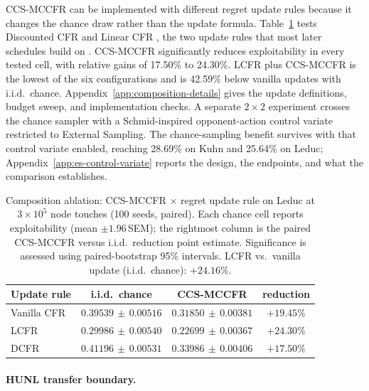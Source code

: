 \documentclass[11pt]{article}
\begin{document}
CCS-MCCFR can be implemented with different regret update rules because it changes the chance draw rather than the update formula. Table~\ref{tab:orthogonal} tests Discounted CFR and Linear CFR \citep{brown2019solving}, the two update rules that most later schedules build on \citep{xu2024dynamic,zhang2026faster}. CCS-MCCFR significantly reduces exploitability in every tested cell, with relative gains of 17.50\% to 24.30\%. LCFR plus CCS-MCCFR is the lowest of the six configurations and is 42.59\% below vanilla updates with i.i.d.\ chance. Appendix~\ref{app:composition-details} gives the update definitions, budget sweep, and implementation checks. A separate $2\times2$ experiment crosses the chance sampler with a Schmid-inspired opponent-action control variate restricted to External Sampling. The chance-sampling benefit survives with that control variate enabled, reaching 28.69\% on Kuhn and 25.64\% on Leduc; Appendix~\ref{app:es-control-variate} reports the design, the endpoints, and what the comparison establishes.

\begin{table}[h]
\centering
\small
\caption{Composition ablation: CCS-MCCFR $\times$ regret update rule on Leduc at $3\times10^5$ node touches (100 seeds, paired). Each chance cell reports exploitability (mean $\pm 1.96$\,SEM); the rightmost column is the paired CCS-MCCFR versus i.i.d.\ reduction point estimate. Significance is assessed using paired-bootstrap 95\% intervals. LCFR vs.\ vanilla update (i.i.d.\ chance): $+24.16\%$.}
\label{tab:orthogonal}
\begin{tabular}{lccc}
\toprule
Update rule & i.i.d.\ chance & CCS-MCCFR & reduction \\
\midrule
Vanilla CFR & $0.39539\,{\pm}\,0.00516$ & $0.31850\,{\pm}\,0.00381$ & \textbf{$+19.45\%$} \\
LCFR        & $0.29986\,{\pm}\,0.00540$ & $0.22699\,{\pm}\,0.00367$ & \textbf{$+24.30\%$} \\
DCFR        & $0.41196\,{\pm}\,0.00531$ & $0.33986\,{\pm}\,0.00406$ & \textbf{$+17.50\%$} \\
\bottomrule
\end{tabular}
\end{table}

\paragraph{HUNL transfer boundary.}
\label{sec:hunl}
\end{document}
